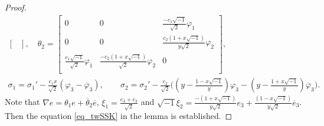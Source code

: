 \documentclass{amsart}
\numberwithin{equation}{section}
\theoremstyle{definition}
\renewcommand{\1}{\mathds{1}}
\renewcommand{\>}{\rightarrow}
\begin{document}
\begin{proof}
\begin{gather*}
\begin{bmatrix}
                            \end{bmatrix}\!\!,\quad
\theta_2 = \begin{bmatrix} 0 & 0 & \frac{-c_1\sqrt{-1}}{\sqrt{2}} \varphi_1 \\
                           0 & 0 & \frac{c_2(1+x\sqrt{-1})}{y\sqrt{2}} \varphi_2 \\
                           \frac{c_1 \sqrt{-1}}{\sqrt{2}} \varphi_1 & \frac{-c_2(1+x\sqrt{-1})}{\sqrt{2}} \varphi_2 & 0 \\ \end{bmatrix}\!\!,\\
\sigma_1 = \sigma_1'-\frac{c_1 x}{\sqrt{2}}(\varphi_3-\overline{\varphi}_3),\qquad
\sigma_2 = \sigma_2' - \frac{c_2}{\sqrt{2}}\big((y-\frac{1-x\sqrt{-1}}{y})\varphi_3 - (y - \frac{1+x\sqrt{-1}}{y}) \overline{\varphi}_3 \big).
\end{gather*}
Note that $\nabla e = \theta_1 e + \overline{\theta}_2 \overline{e}$, $\xi_1 = \frac{e_3 + \overline{e}_3}{\sqrt{2}}$ and $\sqrt{-1}\xi_2 =  \frac{-(1+x\sqrt{-1})}{y\sqrt{2}} e_3 +  \frac{(1-x\sqrt{-1})}{y\sqrt{2}} \overline{e}_3$. Then the equation \eqref{eq_twSSK} in the lemma is established.
\end{proof}
\end{document}

